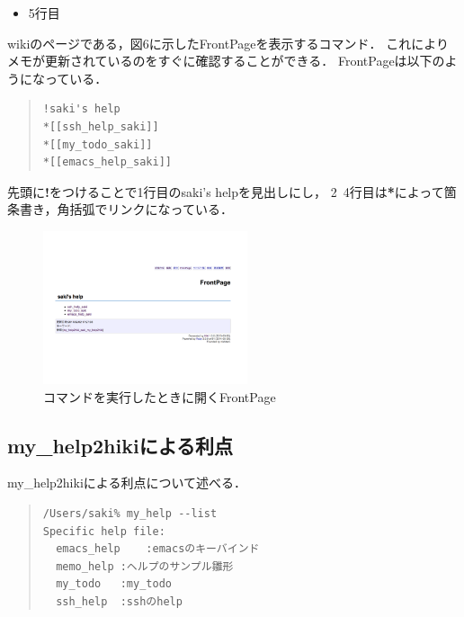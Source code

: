 \begin{itemize}
\item 5行目
\end{itemize}
\begin{description}
\item wikiのページである，図6に示したFrontPageを表示するコマンド．
これによりメモが更新されているのをすぐに確認することができる．
FrontPageは以下のようになっている．
\end{description}
\begin{quote}\begin{verbatim}
!saki's help
*[[ssh_help_saki]]
*[[my_todo_saki]]
*[[emacs_help_saki]]
\end{verbatim}\end{quote}
\begin{description}
\item 先頭に\textbf{!}をつけることで1行目のsaki's helpを見出しにし，
2~4行目は\textbf{*}によって箇条書き，角括弧でリンクになっている．
\end{description}

\begin{figure}[htbp]\begin{center}
\includegraphics[clip,width=6cm,bb=100 100 600 550]{my_help2hiki_saki.002.png}
\caption{コマンドを実行したときに開くFrontPage }
\label{default}\end{center}\end{figure}

\subsection{my\_help2hikiによる利点}
my\_help2hikiによる利点について述べる．

\begin{quote}\begin{verbatim}
/Users/saki% my_help --list
Specific help file:
  emacs_help	:emacsのキーバインド
  memo_help	:ヘルプのサンプル雛形
  my_todo	:my_todo
  ssh_help	:sshのhelp
\end{verbatim}\end{quote}

